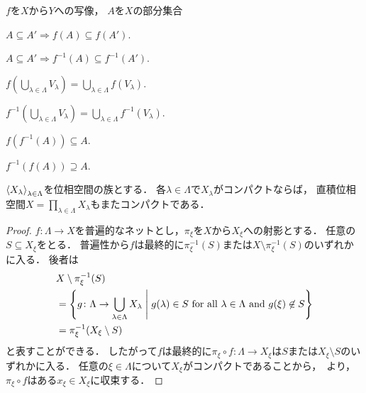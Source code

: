 \documentclass{ltjsbook}
\begin{document}
\begin{thmbox}
\begin{proposition}
\(f\)を\(X\)から\(Y\)への写像，
\(A\)を\(X\)の部分集合
\begin{conditions}
    \item\label{f-increase} \(A \subseteq A' \Rightarrow f(A) \subseteq f(A')\).
    \item\label{f-inv-increase} \(A \subseteq A' \Rightarrow f^{-1}(A) \subseteq f^{-1}(A')\).
    \item\label{f-cup} \(
        f \left(\bigcup_{\lambda \in \Lambda} V_\lambda \right)
        = \bigcup_{\lambda \in \Lambda} f(V_\lambda)
        \).
    \item\label{f-inv-cup} \(
        f^{-1} \left(\bigcup_{\lambda \in \Lambda} V_\lambda \right)
        = \bigcup_{\lambda \in \Lambda} f^{-1}(V_\lambda)
        \).
    \item\label{f-f-inv-a} \(f(f^{-1}(A)) \subseteq A\).
    \item\label{f-inv-f-a} \(f^{-1}(f(A)) \supseteq A\).
\end{conditions}
\end{proposition}
\end{thmbox}

\begin{thmbox}
\begin{theorem}[（Tikhonovの定理）]
\({\langle {X}_\lambda \rangle}_{\lambda \in \Lambda}\)を位相空間の族とする．
各\(\lambda \in \Lambda\)で\(X_\lambda\)がコンパクトならば，
直積位相空間\(X = \prod_{\lambda \in \Lambda} X_\lambda\)もまたコンパクトである．
\end{theorem}
\end{thmbox}

\begin{proof}
\(f\colon \Lambda \to X\)を普遍的なネットとし，\(\pi_\xi\)を\(X\)から\(X_\xi\)への射影とする．
任意の\(S \subseteq X_\xi\)をとる．
普遍性から\(f\)は最終的に\(\pi_\xi^{-1}(S)\)または\(X \setminus \pi_\xi^{-1}(S)\)のいずれかに入る．
後者は
\begin{align*}
    & X \setminus \pi_\xi^{-1}(S) \\
    & = \left\{
        g \colon \Lambda \to \bigcup_{\lambda \in \Lambda} X_\lambda
        \mathrel{}\middle|\mathrel{}
        g(\lambda) \in S \text{ for all } \lambda \in \Lambda \text{ and }
        g(\xi) \not\in S
    \right\} \\
    &= \pi_{\xi}^{-1}(X_\xi \setminus S)
\end{align*}
と表すことができる．
したがって\(f\)は最終的に\(\pi_\xi \circ f \colon \Lambda \to X_\xi\)は\(S\)または\(X_\xi \setminus S\)のいずれかに入る．
任意の\(\xi \in \Lambda\)について\(X_\xi\)がコンパクトであることから，~より，\(\pi_\xi \circ f\)はある\(x_\xi \in X_\xi\)に収束する．
\end{proof}
\end{document}
